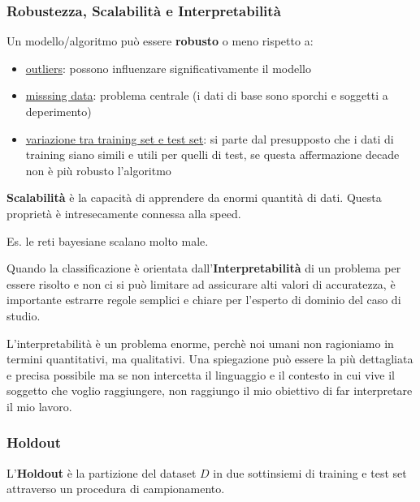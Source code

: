 \subsubsection{Robustezza, Scalabilità e Interpretabilità}
\begin{defn}
	Un modello/algoritmo può essere \textbf{robusto} o meno rispetto a:
\begin{itemize}
	\item \underline{outliers}: possono influenzare significativamente il modello
	\item \underline{misssing data}: problema centrale (i dati di base sono sporchi e soggetti a deperimento)
	\item \underline{variazione tra training set e test set}: si parte dal presupposto che i dati di training siano simili e utili per quelli di test, se questa affermazione decade non \`e pi\`u robusto l'algoritmo
\end{itemize}
\end{defn}

\begin{defn}
	\textbf{Scalabilit\`a} \`e la capacit\`a di apprendere da enormi quantit\`a di dati. Questa proprietà è intresecamente connessa alla speed. 
\end{defn}
Es. le reti bayesiane scalano molto male. 

\begin{defn}
Quando la classificazione è orientata dall'\textbf{Interpretabilit\`a} di un problema per essere risolto e non ci si può limitare ad assicurare alti valori di accuratezza, è importante estrarre regole semplici e chiare per l'esperto di dominio del caso di studio.
\end{defn}
L'interpretabilit\`a \`e un problema enorme, perch\`e noi umani non ragioniamo in termini quantitativi, ma qualitativi. Una spiegazione pu\`o essere la pi\`u dettagliata e precisa possibile ma se non intercetta il linguaggio e il contesto in cui vive il soggetto che voglio raggiungere, non raggiungo il mio obiettivo di far interpretare il mio lavoro.

\subsubsection{Holdout}
\begin{defn}
L'\textbf{Holdout} è la partizione del dataset $D$ in due sottinsiemi di training e test set attraverso un procedura di campionamento. 
\end{defn}

